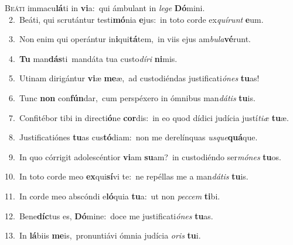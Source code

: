 \lettrine{\initial\textcolor{\initialcolor}{B}}{eáti} immacu\-\textbf{lá}\-ti in \textbf{vi}\-a:~\star qui ámbulant in \textit{le}\-\textit{ge} \textbf{Dó}\-mini.\\
{\numbfont\textcolor{\numbcolor}{~2.}}~Beáti, qui scrutántur testi\-\textbf{mó}\-nia \textbf{e}\-jus:~\star in toto corde ex\-\textit{quí}\-\textit{runt} \textbf{e}\-um.\par
{\numbfont\textcolor{\numbcolor}{~3.}}~Non enim qui operántur in\-\textbf{i}\-qui\-\textbf{tá}\-tem,~\star in viis ejus am\-\textit{bu}\-\textit{la}\textbf{vé}runt.\par
{\numbfont\textcolor{\numbcolor}{~4.}}~\textbf{Tu} man\-\textbf{dás}\-ti~\star mandáta tua custo\-\textit{dí}\-\textit{ri} \textbf{ni}\-mis.\par
{\numbfont\textcolor{\numbcolor}{~5.}}~Utinam dirigántur \textbf{vi}\-æ \textbf{me}\-æ,~\star ad custodiéndas justificati\-\textit{ó}\-\textit{nes} \textbf{tu}\-as!\par
{\numbfont\textcolor{\numbcolor}{~6.}}~Tunc \textbf{non} con\-\textbf{fún}\-dar,~\star cum perspéxero in ómnibus man\-\textit{dá}\-\textit{tis} \textbf{tu}\-is.\par
{\numbfont\textcolor{\numbcolor}{~7.}}~Confitébor tibi in directi\-\textbf{ó}\-ne \textbf{cor}\-dis:~\star in eo quod dídici judícia justí\-\textit{ti}\-\textit{æ} \textbf{tu}\-æ.\par
{\numbfont\textcolor{\numbcolor}{~8.}}~Justificatiónes \textbf{tu}\-as cus\-\textbf{tó}\-diam:~\star non me derelínquas \textit{us}\-\textit{que}\textbf{quá}que.\par
{\numbfont\textcolor{\numbcolor}{~9.}}~In quo córrigit adolescéntior \textbf{vi}\-am \textbf{su}\-am?~\star in custodiéndo ser\-\textit{mó}\-\textit{nes} \textbf{tu}\-os.\par
{\numbfont\textcolor{\numbcolor}{10.}}~In toto corde meo \textbf{ex}\-qui\-\textbf{sí}\-vi te:~\star ne repéllas me a man\-\textit{dá}\-\textit{tis} \textbf{tu}\-is.\par
{\numbfont\textcolor{\numbcolor}{11.}}~In corde meo abscóndi e\-\textbf{ló}\-quia \textbf{tu}\-a:~\star ut non \textit{pec}\-\textit{cem} \textbf{ti}\-bi.\par
{\numbfont\textcolor{\numbcolor}{12.}}~Bene\-\textbf{díc}\-tus es, \textbf{Dó}\-mine:~\star doce me justificati\-\textit{ó}\-\textit{nes} \textbf{tu}\-as.\par
{\numbfont\textcolor{\numbcolor}{13.}}~In \textbf{lá}\-biis \textbf{me}\-is,~\star pronuntiávi ómnia judícia \textit{o}\-\textit{ris} \textbf{tu}\-i.\par
